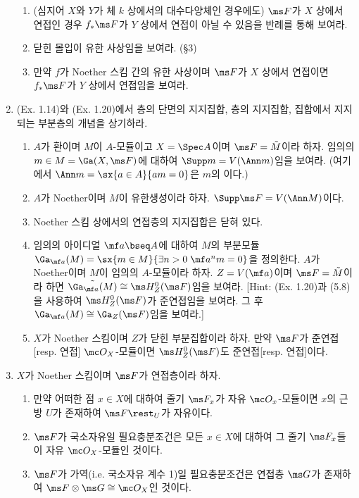 \begin{enumerate}[label=\tb{5.\arabic*.},itemindent=0mm,itemsep=2mm]
	\begin{enumerate}[label=(\alph*)]
	\item (심지어 $X$와 $Y$가 체 $k$ 상에서의 대수다양체인 경우에도)
	$\ms F$가 $X$ 상에서 연접인 경우 $f_*\ms F$가 $Y$ 상에서 연접이 아닐 수 있음을 반례를 통해 보여라.
	\item 닫힌 몰입이 유한 사상임을 보여라. (\S 3)
	\item 만약 $f$가 Noether 스킴 간의 유한 사상이며 $\ms F$가 $X$ 상에서 연접이면 $f_*\ms F$가 $Y$ 상에서 연접임을 보여라.
	\end{enumerate}
	\item {} (Ex. 1.14)와 (Ex. 1.20)에서 층의 단면의 지지집합, 층의 지지집합, 집합에서 지지되는 부분층의 개념을 상기하라.
	\begin{enumerate}[label=(\alph*)]
	\item $A$가 환이며 $M$이 $A$-모듈이고 $X=\Spec A$이며 $\ms F=\tilde M$이라 하자.
	임의의 $m\in M=\Ga(X,\ms F)$에 대하여 $\Supp m=V(\Ann m)$임을 보여라.
	(여기에서 $\Ann m=\sx{a\in A}{am=0}$은 $m$의 이다.)
	\item $A$가 Noether이며 $M$이 유한생성이라 하자. $\Supp\ms F=V(\Ann M)$이다.
	\item Noether 스킴 상에서의 연접층의 지지집합은 닫혀 있다.
	\item 임의의 아이디얼 $\mf a\bseq A$에 대하여 $M$의 부분모듈 $\Ga_{\mf a}(M)=\sx{m\in M}{\exists n>0\;\mf a^nm=0}$을 정의한다.
	$A$가 Noether이며 $M$이 임의의 $A$-모듈이라 하자.
	$Z=V(\mf a)$이며 $\ms F=\tilde M$이라 하면 $\tilde{\Ga_{\mf a}(M)}\cong\ms H^0_Z(\ms F)$임을 보여라.
	[Hint: (Ex. 1.20)과 (5.8)을 사용하여 $\ms H_Z^0(\ms F)$가 준연접임을 보여라. 그 후 $\Ga_{\mf a}(M)\cong\Ga_Z(\ms F)$임을 보여라.]
	\item $X$가 Noether 스킴이며 $Z$가 닫힌 부분집합이라 하자.
	만약 $\ms F$가 준연접[resp. 연접] $\mc O_X$-모듈이면 $\ms H^0_Z(\ms F)$도 준연접[resp. 연접]이다.
	\end{enumerate}
	\item $X$가 Noether 스킴이며 $\ms F$가 연접층이라 하자.
	\begin{enumerate}[label=(\alph*)]
	\item 만약 어떠한 점 $x\in X$에 대하여 줄기 $\ms F_x$가 자유 $\mc O_x$-모듈이면
	$x$의 근방 $U$가 존재하여 $\ms F\rest_U$가 자유이다.
	\item $\ms F$가 국소자유일 필요충분조건은 모든 $x\in X$에 대하여 그 줄기 $\ms F_x$들이 자유 $\mc O_X$-모듈인 것이다.
	\item $\ms F$가 가역(i.e. 국소자유 계수 1)일 필요충분조건은 연접층 $\ms G$가 존재하여 $\ms F\otimes\ms G\cong\mc O_X$인 것이다.

\end{enumerate}
\end{enumerate}
